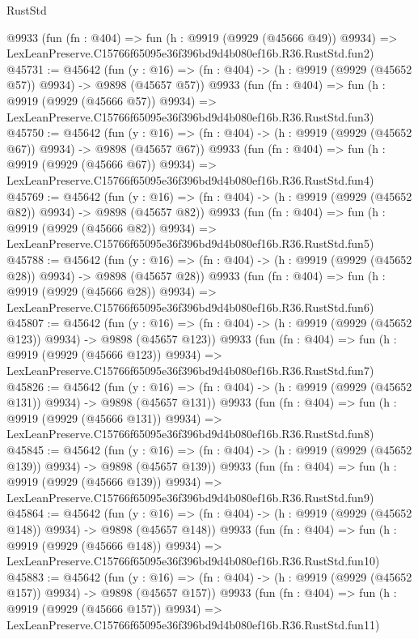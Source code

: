 \begin{lexlean}{RustStd}
\begin{coremodule}
    @9933
    (fun (fn : @404) =>
    fun (h : @9919 (@9929 (@45666 @49)) @9934) =>
    LexLeanPreserve.C15766f65095e36f396bd9d4b080ef16b.R36.RustStd.fun2)
@45731 := @45642
    (fun (y : @16) => (fn : @404) -> (h : @9919 (@9929 (@45652 @57)) @9934) -> @9898 (@45657 @57))
    @9933
    (fun (fn : @404) =>
    fun (h : @9919 (@9929 (@45666 @57)) @9934) =>
    LexLeanPreserve.C15766f65095e36f396bd9d4b080ef16b.R36.RustStd.fun3)
@45750 := @45642
    (fun (y : @16) => (fn : @404) -> (h : @9919 (@9929 (@45652 @67)) @9934) -> @9898 (@45657 @67))
    @9933
    (fun (fn : @404) =>
    fun (h : @9919 (@9929 (@45666 @67)) @9934) =>
    LexLeanPreserve.C15766f65095e36f396bd9d4b080ef16b.R36.RustStd.fun4)
@45769 := @45642
    (fun (y : @16) => (fn : @404) -> (h : @9919 (@9929 (@45652 @82)) @9934) -> @9898 (@45657 @82))
    @9933
    (fun (fn : @404) =>
    fun (h : @9919 (@9929 (@45666 @82)) @9934) =>
    LexLeanPreserve.C15766f65095e36f396bd9d4b080ef16b.R36.RustStd.fun5)
@45788 := @45642
    (fun (y : @16) => (fn : @404) -> (h : @9919 (@9929 (@45652 @28)) @9934) -> @9898 (@45657 @28))
    @9933
    (fun (fn : @404) =>
    fun (h : @9919 (@9929 (@45666 @28)) @9934) =>
    LexLeanPreserve.C15766f65095e36f396bd9d4b080ef16b.R36.RustStd.fun6)
@45807 := @45642
    (fun (y : @16) => (fn : @404) -> (h : @9919 (@9929 (@45652 @123)) @9934) -> @9898 (@45657 @123))
    @9933
    (fun (fn : @404) =>
    fun (h : @9919 (@9929 (@45666 @123)) @9934) =>
    LexLeanPreserve.C15766f65095e36f396bd9d4b080ef16b.R36.RustStd.fun7)
@45826 := @45642
    (fun (y : @16) => (fn : @404) -> (h : @9919 (@9929 (@45652 @131)) @9934) -> @9898 (@45657 @131))
    @9933
    (fun (fn : @404) =>
    fun (h : @9919 (@9929 (@45666 @131)) @9934) =>
    LexLeanPreserve.C15766f65095e36f396bd9d4b080ef16b.R36.RustStd.fun8)
@45845 := @45642
    (fun (y : @16) => (fn : @404) -> (h : @9919 (@9929 (@45652 @139)) @9934) -> @9898 (@45657 @139))
    @9933
    (fun (fn : @404) =>
    fun (h : @9919 (@9929 (@45666 @139)) @9934) =>
    LexLeanPreserve.C15766f65095e36f396bd9d4b080ef16b.R36.RustStd.fun9)
@45864 := @45642
    (fun (y : @16) => (fn : @404) -> (h : @9919 (@9929 (@45652 @148)) @9934) -> @9898 (@45657 @148))
    @9933
    (fun (fn : @404) =>
    fun (h : @9919 (@9929 (@45666 @148)) @9934) =>
    LexLeanPreserve.C15766f65095e36f396bd9d4b080ef16b.R36.RustStd.fun10)
@45883 := @45642
    (fun (y : @16) => (fn : @404) -> (h : @9919 (@9929 (@45652 @157)) @9934) -> @9898 (@45657 @157))
    @9933
    (fun (fn : @404) =>
    fun (h : @9919 (@9929 (@45666 @157)) @9934) =>
    LexLeanPreserve.C15766f65095e36f396bd9d4b080ef16b.R36.RustStd.fun11)

\end{coremodule}
\end{lexlean}
